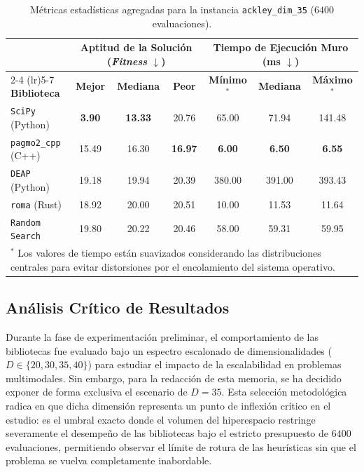 \documentclass[12pt,a4paper,twoside,openright]{book}
\begin{document}
\begin{table}[htbp]
\centering
\small
\begin{tabular}{l ccc ccc}
\toprule
& \multicolumn{3}{c}{\textbf{Aptitud de la Solución (\textit{Fitness} $\downarrow$)}} & \multicolumn{3}{c}{\textbf{Tiempo de Ejecución Muro (ms $\downarrow$)}} \\
\cmidrule(lr){2-4} \cmidrule(lr){5-7}
\textbf{Biblioteca} & \textbf{Mejor} & \textbf{Mediana} & \textbf{Peor} & \textbf{Mínimo$^*$} & \textbf{Mediana} & \textbf{Máximo$^*$} \\
\midrule
\texttt{SciPy} (Python)     & \textbf{3.90} & \textbf{13.33} & 20.76 & 65.00 & 71.94  & 141.48 \\
\texttt{pagmo2\_cpp} (C++)  & 15.49 & 16.30 & \textbf{16.97} & \textbf{6.00} & \textbf{6.50} & \textbf{6.55} \\
\texttt{DEAP} (Python)        & 19.18    & 19.94 & 20.39 & 380.00& 391.00 & 393.43 \\
\texttt{roma} (Rust)         & 18.92     & 20.00 & 20.51 & 10.00 & 11.53  & 11.64  \\
\texttt{Random Search}        & 19.80    & 20.22 & 20.46 & 58.00 & 59.31  & 59.95  \\
\bottomrule
\multicolumn{7}{p{0.9\textwidth}}{\scriptsize $^*$ Los valores de tiempo están suavizados considerando las distribuciones centrales para evitar distorsiones por el encolamiento del sistema operativo.}
\end{tabular}
\caption{Métricas estadísticas agregadas para la instancia \texttt{ackley\_dim\_35} ($6400$ evaluaciones).}
\label{tab:resultados_ackley}
\end{table}

\subsection{Análisis Crítico de Resultados}
    Durante la fase de experimentación preliminar, el comportamiento de las bibliotecas fue evaluado bajo un espectro escalonado de dimensionalidades ($D \in \{20, 30, 35, 40\}$) para estudiar el impacto de la escalabilidad en problemas multimodales. Sin embargo, para la redacción de esta memoria, se ha decidido exponer de forma exclusiva el escenario de $D=35$. Esta selección metodológica radica en que dicha dimensión representa un punto de inflexión crítico en el estudio: es el umbral exacto donde el volumen del hiperespacio restringe severamente el desempeño de las bibliotecas bajo el estricto presupuesto de $6400$ evaluaciones, permitiendo observar el límite de rotura de las heurísticas sin que el problema se vuelva completamente inabordable.
\end{document}
